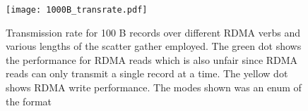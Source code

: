 \begin{figure}[t]
\texttt{[image: 1000B\_transrate.pdf]}
\caption{Transmission rate for 100 B records over different RDMA verbs and 
various lengths of the scatter gather employed.
The green dot shows the performance for RDMA reads which is also unfair
since RDMA reads can only transmit a single record at a time. The yellow dot
shows RDMA write performance. The modes shown was an enum of the format 
}
\label{fig:1000B_transrate}
\end{figure}
